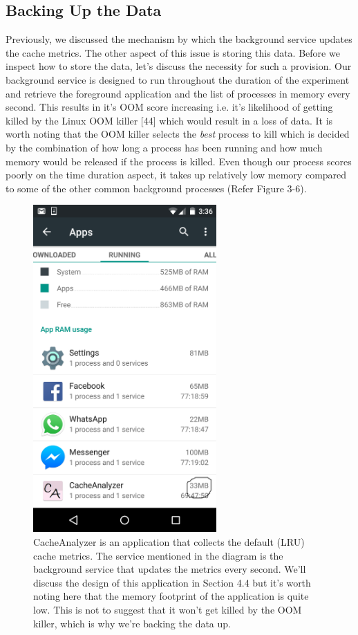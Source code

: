 \documentclass[12pt]{uthesis-v12}  %
\begin{document}
		\subsection{Backing Up the Data}
			Previously, we discussed the mechanism by which the background service updates the cache metrics. The other aspect of this issue is storing this data. Before we inspect how to store the data, let's discuss the necessity for such a provision. Our background service is designed to run throughout the duration of the experiment and retrieve the foreground application and the list of processes in memory every second. This results in it's OOM score increasing i.e. it's likelihood of getting killed by the Linux OOM killer [44] which would result in a loss of data. It is worth noting that the OOM killer selects the {\em best} process to kill which is decided by the combination of how long a process has been running and how much memory would be released if the process is killed. Even though our process scores poorly on the time duration aspect, it takes up relatively low memory compared to some of the other common background processes (Refer Figure 3-6).

			\begin{figure}[h]
				\centering
				\includegraphics[width = 70mm]{images/lowMemory.png}
				\caption[Memory Occupied by the Background Service]{CacheAnalyzer is an application that collects the default (LRU) cache metrics. The service mentioned in the diagram is the background service that updates the metrics every second. We'll discuss the design of this application in Section 4.4 but it's worth noting here that the memory footprint of the application is quite low. This is not to suggest that it won't get killed by the OOM killer, which is why we're backing the data up.}
			\end{figure} 
\end{document}
